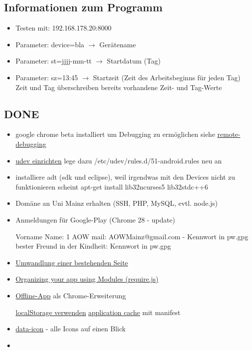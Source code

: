 \documentclass[a4paper]{scrartcl}
\begin{document}
		\subsection{Informationen zum Programm}
			\begin{itemize}
				\item Testen mit: 192.168.178.20:8000
				\item Parameter: device=bla $\rightarrow$ Gerätename
				\item Parameter: st=jjjj-mm-tt $\rightarrow$ Startdatum (Tag)
				\item Parameter: sz=13:45 $\rightarrow$ Startzeit (Zeit des Arbeitsbeginns für jeden Tag)\newline
					Zeit und Tag überschreiben bereits vorhandene Zeit- und Tag-Werte
			\end{itemize}

		\subsection{DONE}
			\begin{itemize}
				\item google chrome beta installiert um Debugging zu ermöglichen siehe \href{https://developers.google.com/chrome-developer-tools/docs/remote-debugging}{remote-debugging}
				\item \href{http://developer.android.com/tools/device.html#setting-up}{udev einrichten} lege dazu /etc/udev/rules.d/51-android.rules neu an
				\item installiere adt (sdk und eclipse), weil irgendwas mit den Devices nicht zu funktionieren scheint \newline apt-get install lib32ncurses5 lib32stdc++6
				\item Domäne an Uni Mainz erhalten (SSH, PHP, MySQL, evtl. node.js)
				\item Anmeldungen für Google-Play (Chrome 28 - update)

					Vorname Name: 1 AOW \newline
					mail: AOWMainz@gmail.com - Kennwort in pw.gpg \newline
					bester Freund in der Kindheit: Kennwort in pw.gpg
				\item \href{http://www.ofbrooklyn.com/2012/11/13/backbonification-migrating-javascript-to-backbone}{Umwandlung einer bestehenden Seite}
				\item \href{http://backbonetutorials.com/organizing-backbone-using-modules/}{Organizing your app using Modules (require.js)}
				\item \href{http://developer.chrome.com/apps/about_apps.html}{Offline-App} als Chrome-Erweiterung
					
					\href{http://docs.webplatform.org/wiki/tutorials/offline_storage}{localStorage verwenden}\newline
					\href{http://docs.webplatform.org/wiki/tutorials/appcache_beginner}{application cache} mit manifest
				\item \href{http://jquerymobile.com/demos/1.3.0-rc.1/docs/lists/lists-themes.html}{data-icon} - alle Icons auf einen Blick
				\item 
			\end{itemize}
\end{document}
